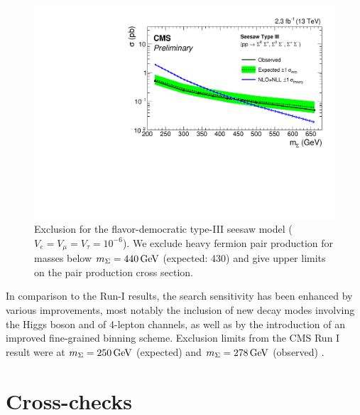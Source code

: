 \begin{figure}
\begin{center}
	\includegraphics[width=.8\textwidth]{Results/exclusion}
	\caption{Exclusion for the flavor-democratic type-III seesaw model ($V_e = V_\mu = V_\tau = 10^{-6}$). We exclude heavy fermion pair production for masses below $m_\Sigma = 440\,\text{Ge\hspace{-.08em}V}$ (expected: 430\GeV) and give upper limits on the pair production cross section.
	\label{fig:exclusion}}
\end{center}
\end{figure}

In comparison to the Run-I results, the search sensitivity has been enhanced by various improvements, most notably the inclusion of new decay modes involving the Higgs boson and of 4-lepton channels, as well as by the introduction of an improved fine-grained binning scheme. Exclusion limits from the CMS Run I result were at $m_\Sigma = 250\,\text{Ge\hspace{-.08em}V}$ (expected) and $m_\Sigma = 278\,\text{Ge\hspace{-.08em}V}$ (observed) \cite{CMS-PAS-EXO-14-001}.

\section{Cross-checks}
